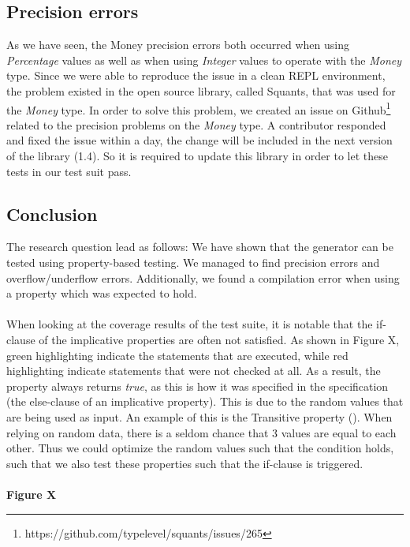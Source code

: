 \subsection*{Precision errors}
As we have seen, the Money precision errors both occurred when using \textit{Percentage} values as well as when using \textit{Integer} values to operate with the \textit{Money} type. Since we were able to reproduce the issue in a clean REPL environment, the problem existed in the open source library, called Squants, that was used for the \textit{Money} type. In order to solve this problem, we created an issue on Github\footnote{https://github.com/typelevel/squants/issues/265} related to the precision problems on the \textit{Money} type. A contributor responded and fixed the issue within a day, the change will be included in the next version of the library (1.4). So it is required to update this library in order to let these tests in our test suit pass.

\subsection*{Conclusion}
The research question lead as follows: \rqThree{} We have shown that the generator can be tested using property-based testing. We managed to find precision errors and overflow/underflow errors. Additionally, we found a compilation error when using a property which was expected to hold.\\
\\
When looking at the coverage results of the test suite, it is notable that the if-clause of the implicative properties are often not satisfied. As shown in Figure X, green highlighting indicate the statements that are executed, while red highlighting indicate statements that were not checked at all. As a result, the property always returns \textit{true}, as this is how it was specified in the specification (the else-clause of an implicative property). This is due to the random values that are being used as input. An example of this is the Transitive property (). When relying on random data, there is a seldom chance that 3 values are equal to each other. Thus we could optimize the random values such that the condition holds, such that we also test these properties such that the if-clause is triggered.\\
\\
\textbf{Figure X}


